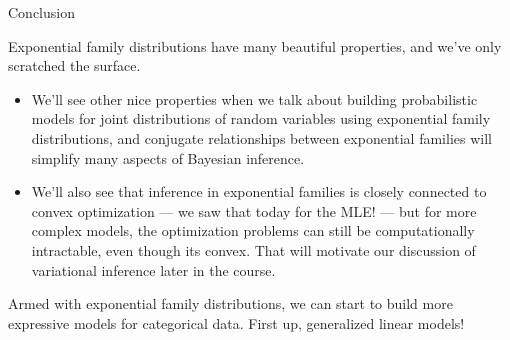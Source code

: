 \documentclass[aspectratio=169]{beamer}
\begin{document}
\begin{frame}[t,allowframebreaks]{Conclusion}\label{conclusion}

Exponential family distributions have many beautiful properties, and we've only scratched the surface. 

\begin{itemize}
    \item We'll see other nice properties when we talk about building probabilistic models for joint distributions of random variables using exponential family distributions, and conjugate relationships between exponential families will simplify many aspects of Bayesian inference. 
    \item We'll also see that inference in exponential families is closely connected to convex optimization --- we saw that today for the MLE! --- but for more complex models, the optimization problems can still be computationally intractable, even though its convex. That will motivate our discussion of variational inference later in the course.
\end{itemize}

Armed with exponential family distributions, we can start to build more expressive models for categorical data. First up, generalized linear models!
\end{frame}

    
    
    
\end{document}
